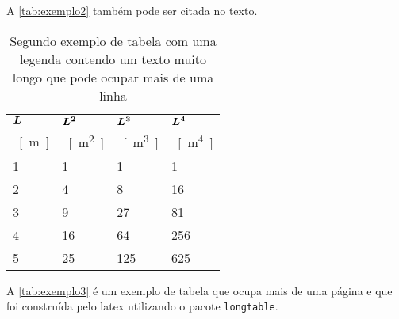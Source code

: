 A \autoref{tab:exemplo2} também pode ser citada no texto.

\begin{table}[htb]%
\caption{Segundo exemplo de tabela com uma legenda contendo um texto muito longo que pode ocupar mais de uma linha}%
\label{tab:exemplo2}%
\begin{tabularx}{\textwidth}{@{\extracolsep{\fill}}llll}%
\toprule
$\boldsymbol{L}$ & $\boldsymbol{L^2}$ & $\boldsymbol{L^3}$ & $\boldsymbol{L^4}$ \\
\SI{}{[m]} & \SI{}{[m^2]} & \SI{}{[m^3]} & \SI{}{[m^4]} \\ \midrule
1          & 1            & 1            & 1            \\
2          & 4            & 8            & 16           \\
3          & 9            & 27           & 81           \\
4          & 16           & 64           & 256          \\
5          & 25           & 125          & 625          \\ \bottomrule
\end{tabularx}
\fonte{}%
\end{table}

A \autoref{tab:exemplo3} é um exemplo de tabela que ocupa mais de uma página e que foi construída pelo \gls{latex} utilizando o pacote \texttt{longtable}.

